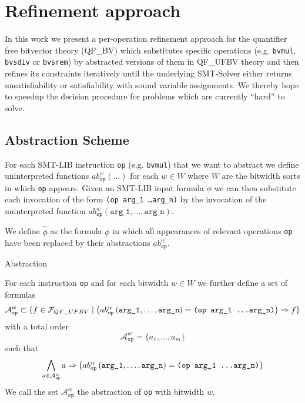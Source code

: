 \chapter{Refinement approach}
\label{ch:refinement_approach}
In this work we present a per-operation refinement approach for the quantifier free bitvector theory (QF\_BV) which substitutes specific operations (e.g. \texttt{bvmul}, \texttt{bvsdiv} or \texttt{bvsrem}) by abstracted versions of them in QF\_UFBV theory and then refines its constraints iteratively until the underlying SMT-Solver either returns unsatisfiability or satisfiability with sound variable assignments. We thereby hope to speedup the decision procedure for problems which are currently \enquote{hard} to solve.

\section{Abstraction Scheme}
\label{sec:refinement_approach:abstraction_scheme}
For each SMT-LIB instruction \texttt{op} (e.g. \texttt{bvmul}) that we want to abstract we define uninterpreted functions $ab_{\texttt{op}}^w\left(\dots\right)$ for each $w\in W$ where $W$ are the bitwidth sorts in which \texttt{op} appears.
Given an SMT-LIB input formula $\phi$ we can then substitute each invocation of the form \texttt{(op arg\_1 \dots arg\_n)} by the invocation of the uninterpreted function $ab_{\texttt{op}}^w\left(\texttt{arg\_1}, \dots, \texttt{arg\_n}\right)$.

We define $\hat{\phi}$ as the formula $\phi$ in which all appearances of relevant operations \texttt{op} have been replaced by their abstractions $ab_\texttt{op}^w$.\\

\begin{definition}{Abstraction}

For each instruction \texttt{op} and for each bitwidth $w\in W$  we further define a set of formulas
\[\mathcal{A}_\texttt{op}^w \subset \{f \in \mathcal{F}_{QF\_UFBV} \mid \left( ab_{\texttt{op}}^w\left(\texttt{arg\_1}, \dots, \texttt{arg\_n}\right)=\texttt{(op arg\_1 \dots arg\_n)} \right) \Rightarrow f\}\]
with a total order
\[\mathcal{A}_\texttt{op}^w  = \{a_1, \dots, a_m\}\]
such that
\[\bigwedge\limits_{a\in\mathcal{A}_\texttt{op}^w} a \Rightarrow \left(ab_{\texttt{op}}^w\left(\texttt{arg\_1}, \dots, \texttt{arg\_n}\right)=\texttt{(op arg\_1 \dots arg\_n)}\right)\]
We call the set $\mathcal{A}_\texttt{op}^w$ the abstraction of \texttt{op} with bitwidth $w$.
\end{definition}

